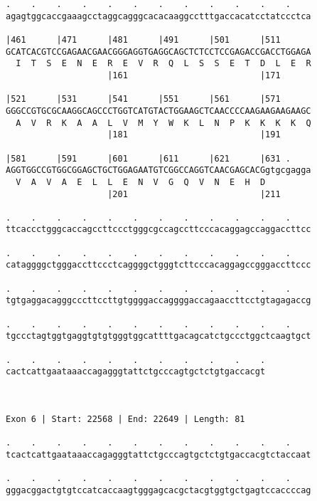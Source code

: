 \documentclass{article}
\begin{document}
\begin{Verbatim}
.    .    .    .    .    .    .    .    .    .    .    .    
agagtggcaccgaaagcctaggcagggcacacaaggcctttgaccacatcctatccctca
                                                            
|461      |471      |481      |491      |501      |511      
GCATCACGTCCGAGAACGAACGGGAGGTGAGGCAGCTCTCCTCCGAGACCGACCTGGAGA
  I  T  S  E  N  E  R  E  V  R  Q  L  S  S  E  T  D  L  E  R
                    |161                          |171      
  
|521      |531      |541      |551      |561      |571      
GGGCCGTGCGCAAGGCAGCCCTGGTCATGTACTGGAAGCTCAACCCCAAGAAGAAGAAGC
  A  V  R  K  A  A  L  V  M  Y  W  K  L  N  P  K  K  K  K  Q
                    |181                          |191      
  
|581      |591      |601      |611      |621      |631 .    
AGGTGGCCGTGGCGGAGCTGCTGGAGAATGTCGGCCAGGTCAACGAGCACGgtgcgagga
  V  A  V  A  E  L  L  E  N  V  G  Q  V  N  E  H  D         
                    |201                          |211      
  
.    .    .    .    .    .    .    .    .    .    .    .    
ttcaccctgggcaccagccttccctgggcgccagccttcccacaggagccaggaccttcc
                                                            
.    .    .    .    .    .    .    .    .    .    .    .    
cataggggctgggaccttccctcaggggctgggtcttcccacaggagccgggaccttccc
                                                            
.    .    .    .    .    .    .    .    .    .    .    .    
tgtgaggacagggcccttccttgtggggaccaggggaccagaaccttcctgtagagaccg
                                                            
.    .    .    .    .    .    .    .    .    .    .    .    
tgccctagtggtgaggtgtgtgggtggcattttgacagcatctgccctggctcaagtgct
                                                            
.    .    .    .    .    .    .    .    .    .    .
cactcattgaataaaccagagggtattctgcccagtgctctgtgaccacgt
                                                   
                                                   
 
Exon 6 | Start: 22568 | End: 22649 | Length: 81
 
.    .    .    .    .    .    .    .    .    .    .    .    
tcactcattgaataaaccagagggtattctgcccagtgctctgtgaccacgtctaccaat
                                                            
.    .    .    .    .    .    .    .    .    .    .    .    
gggacggactgtgtccatcaccaagtgggagcacgctacgtggtgctgagtccaccccag
                                                            

\end{Verbatim}
\end{document}
